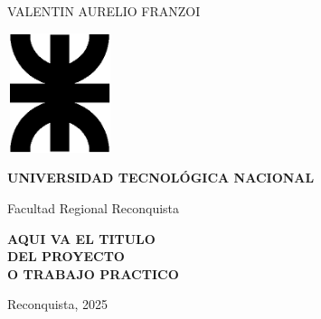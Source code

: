 \thispagestyle{empty}
\begin{center}
	
	

		
	{\large{\textsc{{VALENTIN AURELIO FRANZOI}}}}
	
	\vspace{2cm}
	
	\includegraphics[width=31mm,height=35mm]{imagenes/LogoUTN_nvgsb.eps}
	
	\vspace{2cm}
	
	{\large{\textsc{\textbf{UNIVERSIDAD TECNOLÓGICA NACIONAL}}}}
	
	{\large{Facultad Regional Reconquista}}
	
	\vspace{2cm}
	
	{\Large{\textsc{\textbf{AQUI VA EL TITULO \\ DEL PROYECTO  \\ O TRABAJO PRACTICO\\}}}}
	
	\vfill
	
	{\large{Reconquista, 2025}}
\end{center}